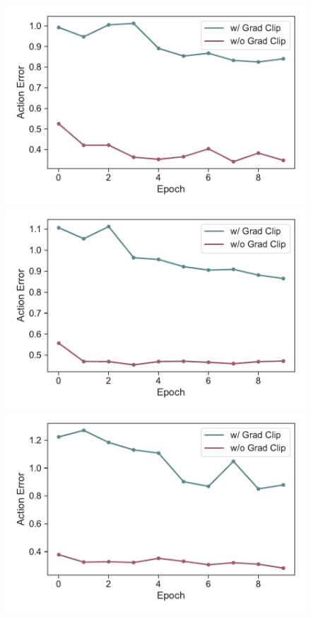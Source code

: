 \documentclass{article}
\begin{document}
\begin{figure}[h]
    \centering
    \begin{minipage}[b]{0.32\linewidth}
        \includegraphics[width=\linewidth]{figs/actionerror_igpt_no_grad_clip_hopper_medium_666.pdf}
    \end{minipage}
    \begin{minipage}[b]{0.32\linewidth}
        \includegraphics[width=\linewidth]{figs/actionerror_igpt_no_grad_clip_halfcheetah_medium_666.pdf}
    \end{minipage}
    \begin{minipage}[b]{0.32\linewidth}
        \includegraphics[width=\linewidth]{figs/actionerror_igpt_no_grad_clip_walker2d_medium_666.pdf}

\end{minipage}
\end{figure}
\end{document}
